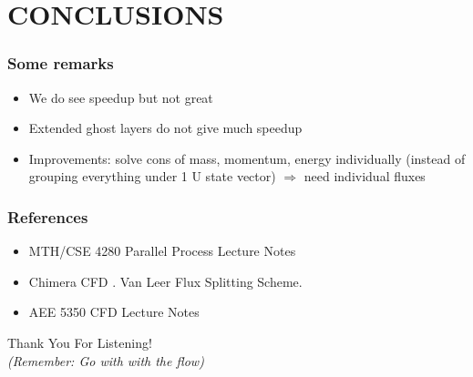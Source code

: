 \documentclass{beamer}
\begin{document}
    \section{CONCLUSIONS}
    \begin{frame}
        \frametitle{Some remarks}
        \begin{itemize}
            \item We do see speedup but not great 
            \item Extended ghost layers do not give much speedup 
            \item Improvements: solve cons of mass, momentum, energy individually (instead of grouping everything under 1 U state vector) $\Rightarrow$ need individual fluxes
        \end{itemize}      

    \end{frame}


    \begin{frame}
        \frametitle{References}
        \begin{itemize}
            \item MTH/CSE 4280 Parallel Process Lecture Notes
            \item Chimera CFD . Van Leer Flux Splitting Scheme.
            \item AEE 5350 CFD Lecture Notes 
            
        \end{itemize}
        
    \end{frame}

    \begin{frame}
        \begin{center}
            \noindent
            \Large{Thank You For Listening! \\ \textit{(Remember: Go with with the flow)}}
            
        \end{center}
    \end{frame}

    



    
\end{document}
